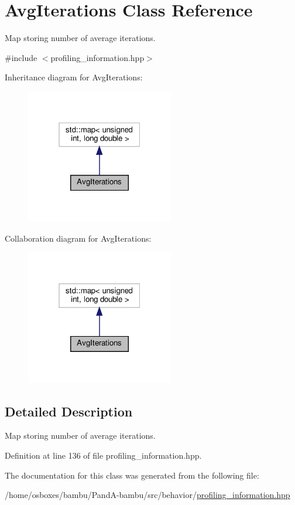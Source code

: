 \hypertarget{classAvgIterations}{}\section{Avg\+Iterations Class Reference}
\label{classAvgIterations}


Map storing number of average iterations.  




{\ttfamily \#include $<$profiling\+\_\+information.\+hpp$>$}



Inheritance diagram for Avg\+Iterations\+:
\nopagebreak
\begin{figure}[H]
\begin{center}
\leavevmode
\includegraphics[width=183pt]{d5/ddf/classAvgIterations__inherit__graph}
\end{center}
\end{figure}


Collaboration diagram for Avg\+Iterations\+:
\nopagebreak
\begin{figure}[H]
\begin{center}
\leavevmode
\includegraphics[width=183pt]{d2/d2d/classAvgIterations__coll__graph}
\end{center}
\end{figure}


\subsection{Detailed Description}
Map storing number of average iterations. 

Definition at line 136 of file profiling\+\_\+information.\+hpp.



The documentation for this class was generated from the following file\+:\begin{DoxyCompactItemize}
\item 
/home/osboxes/bambu/\+Pand\+A-\/bambu/src/behavior/\hyperlink{profiling__information_8hpp}{profiling\+\_\+information.\+hpp}\end{DoxyCompactItemize}
